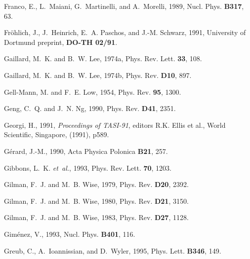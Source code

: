 \begin{thebibliography}{\protect{}1991}
Franco, E., L.~Maiani, G.~Martinelli, and A.~Morelli, 1989,
\newblock Nucl. Phys. {\bf B317}, 63.

Fr{\"o}hlich, J., J.~Heinrich, E.~A. Paschos, and J.-M. Schwarz, 1991,
\newblock University of Dortmund preprint, {\bf DO-TH 02/91}.

Gaillard, M.~K. and B.~W. Lee, 1974a,
\newblock Phys. Rev. Lett. {\bf 33}, 108.

Gaillard, M.~K. and B.~W. Lee, 1974b,
\newblock Phys. Rev. {\bf D10}, 897.

Gell-Mann, M. and F.~E. Low, 1954,
\newblock Phys. Rev. {\bf 95}, 1300.

Geng, C.~Q. and J.~N. Ng, 1990,
\newblock Phys. Rev. {\bf D41}, 2351.

Georgi, H., 1991,
 {\em Proceedings of TASI-91}, {\rm editors R.K. Ellis et
  al., World Scientific, Singapore, (1991), p\. 589}.

G\'{e}rard, J.-M., 1990,
\newblock Acta Physica Polonica {\bf B21}, 257.

Gibbons, L.~K. {\em et~al.\/}, 1993,
\newblock Phys. Rev. Lett. {\bf 70}, 1203.

Gilman, F.~J. and M.~B. Wise, 1979,
\newblock Phys. Rev. {\bf D20}, 2392.

Gilman, F.~J. and M.~B. Wise, 1980,
\newblock Phys. Rev. {\bf D21}, 3150.

Gilman, F.~J. and M.~B. Wise, 1983,
\newblock Phys. Rev. {\bf D27}, 1128.

Gim\'{e}nez, V., 1993,
\newblock Nucl. Phys. {\bf B401}, 116.

Greub, C., A.~Ioannissian, and D.~Wyler, 1995,
\newblock Phys. Lett. {\bf B346}, 149.


\end{thebibliography}
